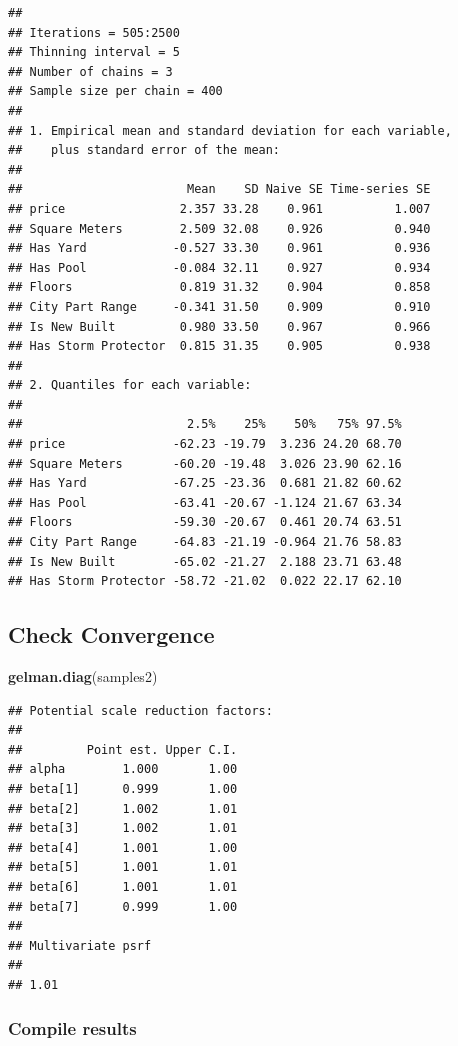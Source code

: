 \documentclass[
]{article}
\newenvironment{Shaded}{\begin{snugshade}}{\end{snugshade}}
\newcommand{\FunctionTok}[1]{\textcolor[rgb]{0.13,0.29,0.53}{\textbf{#1}}}
\newcommand{\NormalTok}[1]{#1}
\begin{document}
\begin{verbatim}
## 
## Iterations = 505:2500
## Thinning interval = 5 
## Number of chains = 3 
## Sample size per chain = 400 
## 
## 1. Empirical mean and standard deviation for each variable,
##    plus standard error of the mean:
## 
##                       Mean    SD Naive SE Time-series SE
## price                2.357 33.28    0.961          1.007
## Square Meters        2.509 32.08    0.926          0.940
## Has Yard            -0.527 33.30    0.961          0.936
## Has Pool            -0.084 32.11    0.927          0.934
## Floors               0.819 31.32    0.904          0.858
## City Part Range     -0.341 31.50    0.909          0.910
## Is New Built         0.980 33.50    0.967          0.966
## Has Storm Protector  0.815 31.35    0.905          0.938
## 
## 2. Quantiles for each variable:
## 
##                       2.5%    25%    50%   75% 97.5%
## price               -62.23 -19.79  3.236 24.20 68.70
## Square Meters       -60.20 -19.48  3.026 23.90 62.16
## Has Yard            -67.25 -23.36  0.681 21.82 60.62
## Has Pool            -63.41 -20.67 -1.124 21.67 63.34
## Floors              -59.30 -20.67  0.461 20.74 63.51
## City Part Range     -64.83 -21.19 -0.964 21.76 58.83
## Is New Built        -65.02 -21.27  2.188 23.71 63.48
## Has Storm Protector -58.72 -21.02  0.022 22.17 62.10
\end{verbatim}

\subsection{Check Convergence}\label{check-convergence-1}

\begin{Shaded}
\begin{Highlighting}[]
\FunctionTok{gelman.diag}\NormalTok{(samples2)}
\end{Highlighting}
\end{Shaded}

\begin{verbatim}
## Potential scale reduction factors:
## 
##         Point est. Upper C.I.
## alpha        1.000       1.00
## beta[1]      0.999       1.00
## beta[2]      1.002       1.01
## beta[3]      1.002       1.01
## beta[4]      1.001       1.00
## beta[5]      1.001       1.01
## beta[6]      1.001       1.01
## beta[7]      0.999       1.00
## 
## Multivariate psrf
## 
## 1.01
\end{verbatim}

\subsubsection{Compile results}\label{compile-results-1}
\end{document}
